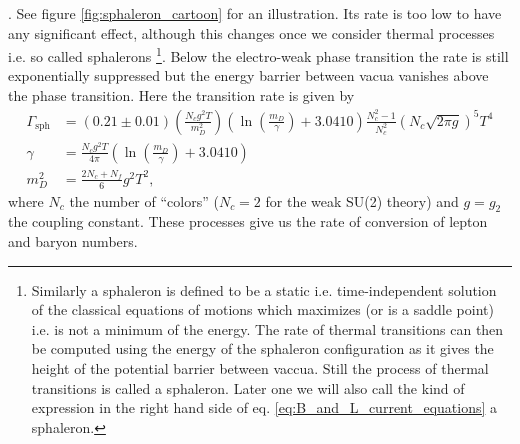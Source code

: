 \documentclass[master,       %
               twoside,        %
               BCOR10mm,       %
               english,ngerman, %
               ]{GAUBM}
\begin{document}
\begin{otherlanguage}{english}
{}. See figure \ref{fig:sphaleron_cartoon} for an illustration.
Its rate is too low to have any significant effect, although this changes once we consider thermal processes i.e. so called sphalerons \footnote{
Similarly a sphaleron is defined to be a static i.e. time-independent solution of the classical equations of motions which maximizes (or is a saddle point) i.e. is not a minimum of the energy.
The rate of thermal transitions can then be computed using the energy of the sphaleron configuration as it gives the height of the potential barrier between vaccua.
Still the process of thermal transitions is called a sphaleron. Later one we will also call the kind of expression in the right hand side of eq. \eqref{eq:B_and_L_current_equations} a sphaleron.
}.
Below the electro-weak phase transition the rate is still exponentially suppressed but the energy barrier between vacua vanishes above the phase transition. Here the transition rate is given by
\begin{align}
	\Gamma_{\mathrm{sph}} &= (0.21 \pm 0.01) \left(\frac{N_c g^2 T}{m_D^2} \right) \left(\ln \left(\frac{m_D}{\gamma} \right) + 3.0410 \right) \frac{N_c^2 - 1}{N_c^2} (N_c \sqrt{2 \pi g})^5 T^4 \\
	\gamma &= \frac{N_c g^2 T}{4 \pi} \left(\ln \left(\frac{m_D}{\gamma}\right) + 3.0410 \right) \nonumber \\
	m_D^2 &= \frac{2N_c + N_f}{6} g^2 T^2 \nonumber,
\end{align}
where $N_c$ the number of ``colors'' ($N_c = 2$ for the weak SU(2) theory) and $g = g_2$ the coupling constant.
These processes give us the rate of conversion of lepton and baryon numbers.


\end{otherlanguage}
\end{document}
